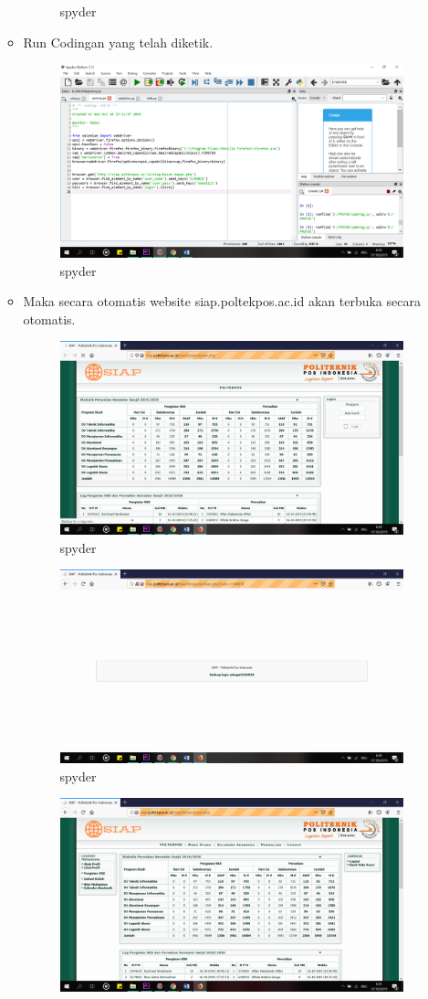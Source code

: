 \begin{enumerate}
\begin{itemize}
\begin{figure}[!htbp]
\caption{spyder}
\end{figure}
\item Run Codingan yang telah diketik.
\begin{figure}[!htbp]
\centering
\includegraphics[width=10cm]{gambar/spy4.png}
\caption{spyder}
\end{figure}
\item Maka secara otomatis website siap.poltekpos.ac.id akan terbuka secara otomatis.
\begin{figure}[!htbp]
\centering
\includegraphics[width=10cm]{gambar/spy5.png}
\caption{spyder}
\end{figure}
\begin{figure}[!htbp]
\centering
\includegraphics[width=10cm]{gambar/spy6.png}
\caption{spyder}
\end{figure}
\begin{figure}[!htbp]
\centering
\includegraphics[width=10cm]{gambar/spy7.png}

\end{figure}
\end{itemize}
\end{enumerate}
